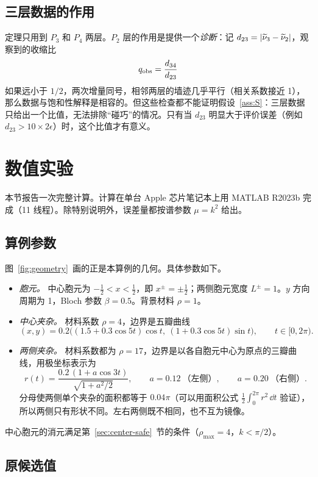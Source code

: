 \documentclass[11pt,a4paper,fontset=fandol]{ctexart}
\begin{document}
\subsection{三层数据的作用}
\label{sec:q-obs}

定理只用到 $P_3$ 和 $P_4$ 两层。$P_2$ 层的作用是提供一个\emph{诊断}：记 $d_{23}=|\widetilde\nu_3-\widetilde\nu_2|$，观察到的收缩比
\[
q_{\rm obs}=\frac{d_{34}}{d_{23}}
\]
如果远小于 $1/2$，两次增量同号，相邻两层的墙迹几乎平行（相关系数接近 1），那么数据与饱和性解释是相容的。但这些检查都不能证明假设~\ref{ass:S}：三层数据只给出一个比值，无法排除“碰巧”的情况。只有当 $d_{23}$ 明显大于评价误差（例如 $d_{23}>10\times2\epsilon$）时，这个比值才有意义。
\section{数值实验}
\label{sec:numerics}

本节报告一次完整计算。计算在单台 Apple 芯片笔记本上用 MATLAB R2023b 完成（11 线程）。除特别说明外，误差量都按谱参数 $\mu=k^2$ 给出。

\subsection{算例参数}

图~\ref{fig:geometry}~画的正是本算例的几何。具体参数如下。
\begin{itemize}
\item \emph{胞元。} 中心胞元为 $-\tfrac12<x<\tfrac12$，即 $x^\pm=\pm\tfrac12$；两侧胞元宽度 $L^\pm=1$。$y$ 方向周期为 1，Bloch 参数 $\beta=0.5$。背景材料 $\rho=1$。
\item \emph{中心夹杂。} 材料系数 $\rho=4$，边界是五瓣曲线
\[
(x,y)=0.2\bigl((1.5+0.3\cos5t)\cos t,\ (1+0.3\cos5t)\sin t\bigr),\qquad t\in[0,2\pi) .
\]
\item \emph{两侧夹杂。} 材料系数都为 $\rho=17$，边界是以各自胞元中心为原点的三瓣曲线，用极坐标表示为
\[
r(t)=\frac{0.2\,(1+a\cos3t)}{\sqrt{1+a^2/2}},\qquad a=0.12\ \text{（左侧）},\qquad a=0.20\ \text{（右侧）}.
\]
分母使两侧单个夹杂的面积都等于 $0.04\pi$（可以用面积公式 $\frac12\int_0^{2\pi}r^2\,\dd t$ 验证），所以两侧只有形状不同。左右两侧既不相同，也不互为镜像。
\end{itemize}
中心胞元的消元满足第~\ref{sec:center-safe}~节的条件（$\rho_{\max}=4$，$k<\pi/2$）。

\subsection{原候选值}
\end{document}
